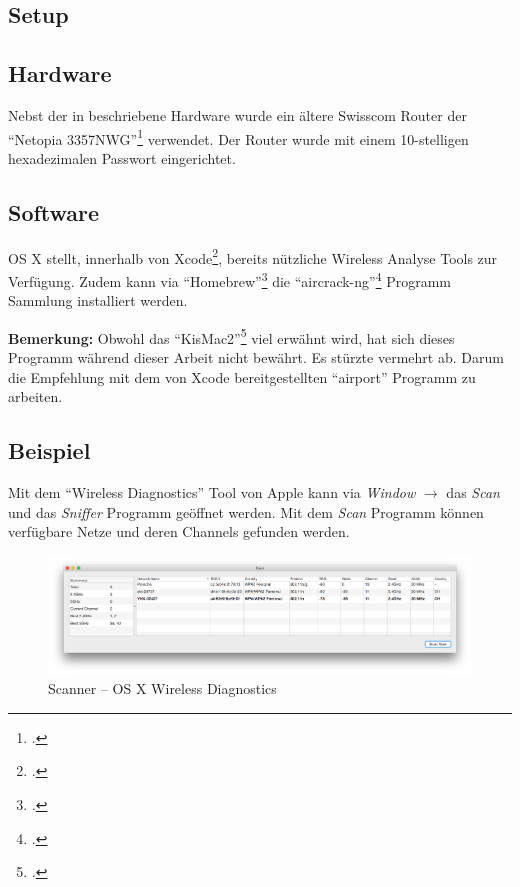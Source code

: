\subsection{Setup}
\subsection{Hardware}
Nebst der in  beschriebene Hardware wurde ein ältere Swisscom Router der "`Netopia  3357NWG"'\footcite{Netopia_3347_57nwg_de_2015-04-06} verwendet. Der Router wurde mit einem 10-stelligen hexadezimalen Passwort eingerichtet.

\subsection{Software}
OS X stellt, innerhalb von Xcode\footcite{Xcode_Apple_Developer_2015-04-06}, bereits nützliche Wireless Analyse Tools zur Verfügung.
Zudem kann via "`Homebrew"'\footcite{Homebrew__The_missing_package_manager_for_OS_X_2015-04-06} die "`aircrack-ng"'\footcite{Aircrack-ng_2015-04-06} Programm Sammlung installiert werden.

\begin{framed}
	\textbf{Bemerkung:} Obwohl das "`KisMac2"'\footcite{IGR_Software_KisMac2_2015-04-06} viel erwähnt wird, hat sich dieses Programm während dieser Arbeit nicht bewährt. Es stürzte vermehrt ab. Darum die Empfehlung mit dem von Xcode bereitgestellten "`airport"' Programm zu arbeiten.
\end{framed}

\subsection{Beispiel}
Mit dem "`Wireless Diagnostics"' Tool von Apple kann via \textit{Window} $\rightarrow$ das \textit{Scan} und das \textit{Sniffer} Programm geöffnet werden.
Mit dem \textit{Scan} Programm können verfügbare Netze und deren Channels gefunden werden.

\begin{figure}[H]
	\centering
	\includegraphics[width=1.0\textwidth]{images/wep/scan.png}
	\caption{Scanner -- OS X Wireless Diagnostics}
\end{figure}


